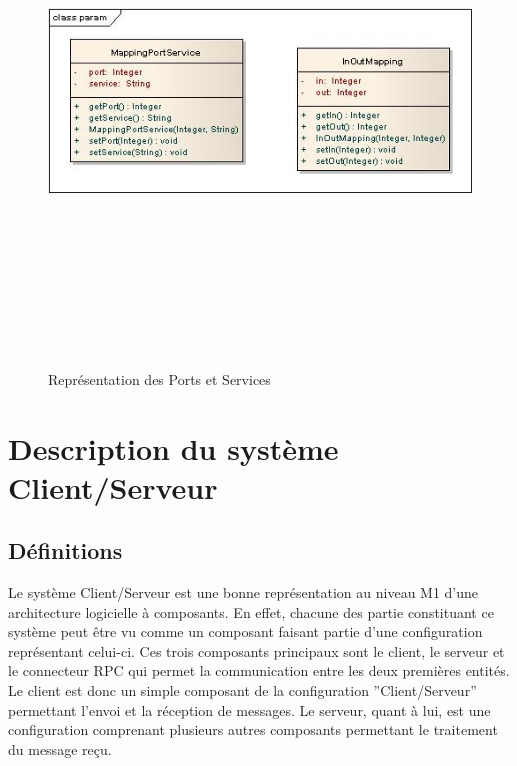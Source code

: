 \documentclass[11pt,a4paper]{article}
\begin{document}
\begin{figure}[h]
  		\centering
  		\includegraphics[height=14cm,width=15cm]{param.jpg}
  		\caption{Représentation des Ports et Services}
  		\label{Représentation des Ports et Services}
\end{figure}


\clearpage
\section{Description du système Client/Serveur}
\subsection{Définitions}
Le système Client/Serveur est une bonne représentation au niveau M1 d'une
architecture logicielle à composants. En effet, chacune des partie constituant
ce système peut être vu comme un composant faisant partie d'une configuration
représentant celui-ci. Ces trois composants principaux sont le client, le
serveur et le connecteur RPC qui permet la communication entre les deux
premières entités.\\

Le client est donc un simple composant de la configuration ''Client/Serveur''
permettant l'envoi et la réception de messages. Le serveur, quant à lui, est
une configuration comprenant plusieurs autres composants permettant le
traitement du message reçu.
\end{document}
